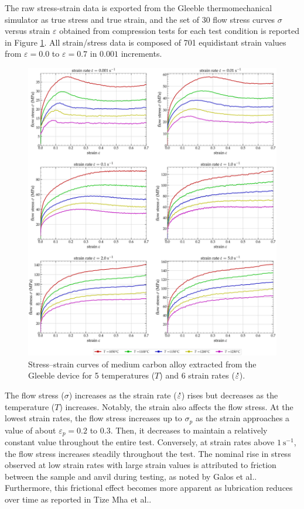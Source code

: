 \documentclass[metals,article,submit,pdftex,moreauthors]{Definitions/mdpi}
\makeatletter
\DeclareRobustCommand{\mdot}[1]{\accentset{\mbox{\bfseries .}}{#1}}
\DeclareRobustCommand{\eal}{et al.\@\xspace}
\DeclareRobustCommand{\ps}{\text{s}^{-1}}
\makeatother
\begin{document}
The raw stress-strain data is exported from the Gleeble thermomechanical simulator as true stress and true strain, and the set of 30 flow stress curves $\sigma$ versus strain $\varepsilon$ obtained from compression tests for each test condition is reported in Figure \ref{fig:RawData}.
All strain/stress data is composed of 701 equidistant strain values from $\varepsilon=0.0$ to $\varepsilon=0.7$ in $0.001$ increments.
\begin{figure}[H]
\centering
\includegraphics[width=0.9\columnwidth]{Figures/rawData}
\caption{Stress--strain curves of medium carbon alloy extracted from the Gleeble device for 5 temperatures ($T$) and 6 strain rates ($\mdot\varepsilon$).}
\label{fig:RawData}
\end{figure}

The flow stress ($\sigma$) increases as the strain rate ($\mdot\varepsilon$) rises but decreases as the temperature ($T$) increases.
Notably, the strain also affects the flow stress.
At the lowest strain rates, the flow stress increases up to $\sigma_p$ as the strain approaches a value of about $\varepsilon_p=0.2$ to $0.3$.
Then, it decreases to maintain a relatively constant value throughout the entire test.
Conversely, at strain rates above $1~\ps$, the flow stress increases steadily throughout the test.
The nominal rise in stress observed at low strain rates with large strain values is attributed to friction between the sample and anvil during testing, as noted by Galos \eal \cite{Galos-2022}.
Furthermore, this frictional effect becomes more apparent as lubrication reduces over time as reported in Tize Mha \eal \cite{TizeMha-2023}.
\end{document}
